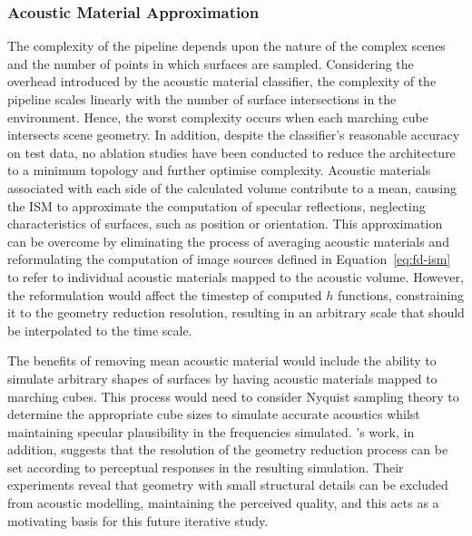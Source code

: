 \subsubsection{Acoustic Material Approximation}
The complexity of the pipeline depends upon the nature of the complex scenes and the number of points in which surfaces are sampled. Considering the overhead introduced by the acoustic material classifier, the complexity of the pipeline scales linearly with the number of surface intersections in the environment. Hence, the worst complexity occurs when each marching cube intersects scene geometry. In addition, despite the classifier's reasonable accuracy on test data, no ablation studies have been conducted to reduce the architecture to a minimum topology and further optimise complexity. Acoustic materials associated with each side of the calculated volume contribute to a mean, causing the ISM to approximate the computation of specular reflections, neglecting characteristics of surfaces, such as position or orientation. This approximation can be overcome by eliminating the process of averaging acoustic materials and reformulating the computation of image sources defined in Equation~\ref{eq:fd-ism} to refer to individual acoustic materials mapped to the acoustic volume. However, the reformulation would affect the timestep of computed $h$ functions, constraining it to the geometry reduction resolution, resulting in an arbitrary scale that should be interpolated to the time scale. \par
The benefits of removing mean acoustic material would include the ability to simulate arbitrary shapes of surfaces by having acoustic materials mapped to marching cubes. This process would need to consider Nyquist sampling theory to determine the appropriate cube sizes to simulate accurate acoustics whilst maintaining specular plausibility in the frequencies simulated. \citep{pelzer2010frequency}'s work, in addition, suggests that the resolution of the geometry reduction process can be set according to perceptual responses in the resulting simulation. Their experiments reveal that geometry with small structural details can be excluded from acoustic modelling, maintaining the perceived quality, and this acts as a motivating basis for this future iterative study. \par

